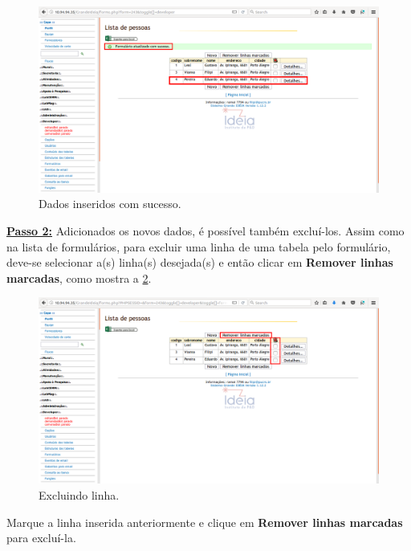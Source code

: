 \documentclass[9pt]{report}
\begin{document}
{      \begin{figure}[H]
        \includegraphics[width=\textwidth]{2_Formularios/2_Criacao_de_formularios/18.png}
        \caption{Dados inseridos com sucesso.}
        \label{fig:insersucesso}
      \end{figure}

      \underline{\textbf{Passo 2:}} Adicionados os novos dados, é
      possível também excluí-los. Assim como na lista de formulários, para excluir uma linha de uma tabela pelo formulário, deve-se selecionar a(s) linha(s) desejada(s) e então clicar em \textbf{Remover linhas marcadas}, como mostra a \figurename{ \ref{fig:linhasexclusao}}.

      \begin{figure}[H]
        \includegraphics[width=\textwidth]{2_Formularios/2_Criacao_de_formularios/19.png}
        \caption{Excluindo linha.}
        \label{fig:linhasexclusao}
      \end{figure}

      Marque a linha inserida anteriormente e clique em \textbf{Remover linhas marcadas} para excluí-la.

}
\end{document}
